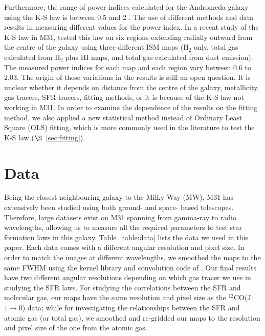 \documentclass[useAMS,usenatbib]{mn2e}
\begin{document}
Furthermore, the range of power indices calculated for the Andromeda galaxy using the K-S law is between 0.5 and 2 \citep[e.g.][]{Tabatabaei10,Ford13}. The use of different methods and data results in measuring different values for the power index. In a recent study of the K-S law in M31, \cite{Ford13} tested this law on six regions extending radially outward from the centre of the galaxy using three different ISM maps (H$_2$ only, total gas calculated from H$_2$ plus HI maps, and total gas calculated from dust emission). The measured power indices for each map and each region vary between 0.6 to 2.03. The origin of these variations in the results is still an open question. It is unclear whether it depends on distance from the centre of the galaxy, metallicity, gas tracers, SFR tracers, fitting methods, or it is because of the K-S law not working in M31. In order to examine the dependence of the results on the fitting method, we also applied a new statistical method instead of Ordinary Least Square (OLS) fitting, which is more commonly used in the literature to test the K-S law ($\S$~\ref{sec:fitting}). %




\section{Data}
\label{sec:data}
Being the closest neighbouring galaxy to the Milky Way (MW), M31 has extensively been studied using both ground- and space- based telescopes. Therefore, large datasets exist on M31 spanning from gamma-ray to radio wavelengths, allowing us to measure all the required parameters to test star formation laws in this galaxy. Table~\ref{table:data} lists the data we used in this paper. Each data comes with a different angular resolution and pixel size. In order to match the images at different wavelengths, we smoothed the maps to the same FWHM using the kernel library and convolution code of \citet{Aniano11}. Our final results have two different angular resolutions depending on which gas tracer we use in studying the SFR laws. For studying the correlations between the SFR and molecular gas, our maps have the same resolution and pixel size as the $^{12}$CO(J:$1\rightarrow0$) data; while for investigating the relationships between the SFR and atomic gas (or total gas), we smoothed and re-gridded our maps to the resolution and pixel size of the one from the atomic gas. 
\end{document}
